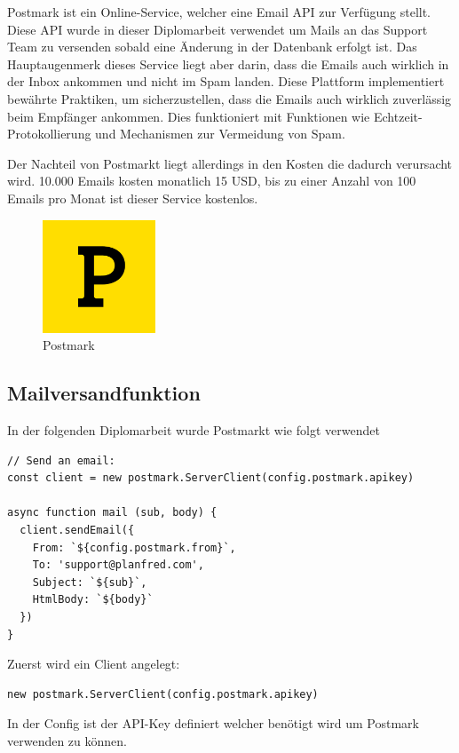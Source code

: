 Postmark ist ein Online-Service, welcher eine Email API zur Verfügung stellt. Diese API wurde in dieser Diplomarbeit verwendet um Mails an das Support Team zu versenden sobald eine Änderung in der Datenbank erfolgt ist. Das Hauptaugenmerk dieses Service liegt aber darin, dass die Emails auch wirklich in der Inbox ankommen und nicht im Spam landen. Diese Plattform implementiert bewährte Praktiken, um sicherzustellen, dass die Emails auch wirklich zuverlässig beim Empfänger ankommen. Dies funktioniert mit Funktionen wie Echtzeit-Protokollierung und Mechanismen zur Vermeidung von Spam.

Der Nachteil von Postmarkt liegt allerdings in den Kosten die dadurch verursacht wird. 10.000 Emails kosten monatlich 15 USD, bis zu einer Anzahl von 100 Emails pro Monat ist dieser Service kostenlos.

\begin{figure}[h!]
    \centering
    \includegraphics[width=0.3\textwidth]{pics/postmark.png}
    \caption{Postmark}
    \label{fig:enter-label}
\end{figure}


\subsection{Mailversandfunktion}

In der folgenden Diplomarbeit wurde Postmarkt wie folgt verwendet


\begin{lstlisting}
// Send an email:
const client = new postmark.ServerClient(config.postmark.apikey)

async function mail (sub, body) {
  client.sendEmail({
    From: `${config.postmark.from}`,
    To: 'support@planfred.com',
    Subject: `${sub}`,
    HtmlBody: `${body}`
  })
}
\end{lstlisting}

Zuerst wird ein Client angelegt:
\begin{lstlisting}
new postmark.ServerClient(config.postmark.apikey)
\end{lstlisting}
In der Config ist der API-Key definiert welcher benötigt wird um Postmark verwenden zu können.

